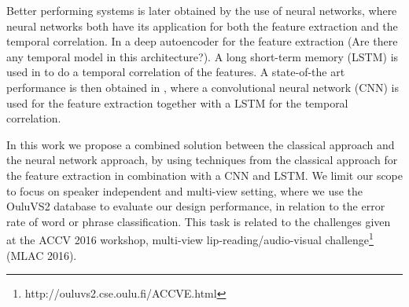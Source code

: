 Better performing systems is later obtained by the use of neural networks, where neural networks both have its application for both the feature extraction and the temporal correlation.
In \cite{Ngiam2011} a deep autoencoder for the feature extraction (Are there any temporal model in this architecture?).
A long short-term memory (LSTM) is used in \cite{Wand2016} to do a temporal correlation of the features.
A state-of-the art performance is then obtained in \cite{Lee}, where a convolutional neural network (CNN) is used for the feature extraction together with a LSTM for the temporal correlation.

In this work we propose a combined solution between the classical approach and the neural network approach, by using techniques from the classical approach for the feature extraction in combination with a CNN and LSTM.
We limit our scope to focus on speaker independent and multi-view setting, where we use the OuluVS2 database\cite{Anina2015} to evaluate our design performance, in relation to the error rate of word or phrase classification.
This task is related to the challenges given at the ACCV 2016 workshop, multi-view lip-reading/audio-visual challenge\footnote{http://ouluvs2.cse.oulu.fi/ACCVE.html} (MLAC 2016).
